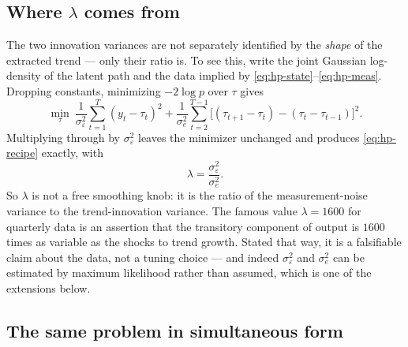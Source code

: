 \documentclass[11pt]{article}
\begin{document}
\subsection{Where \texorpdfstring{$\lambda$}{lambda} comes from}

The two innovation variances are not separately identified by the
\emph{shape} of the extracted trend --- only their ratio is.  To see
this, write the joint Gaussian log-density of the latent path and the
data implied by \eqref{eq:hp-state}--\eqref{eq:hp-meas}.  Dropping
constants, minimizing $-2\log p$ over $\tau$ gives
\begin{equation}
\min_{\tau}\ \frac{1}{\sigma_\varepsilon^2}\sum_{t=1}^{T}(y_t-\tau_t)^2
   + \frac{1}{\sigma_e^2}\sum_{t=2}^{T-1}\bigl[(\tau_{t+1}-\tau_t)-(\tau_t-\tau_{t-1})\bigr]^2.
\label{eq:hp-mle}
\end{equation}
Multiplying through by $\sigma_\varepsilon^2$ leaves the minimizer
unchanged and produces \eqref{eq:hp-recipe} exactly, with
\begin{equation}
\boxed{\ \lambda=\frac{\sigma_\varepsilon^2}{\sigma_e^2}.\ }
\label{eq:lambda}
\end{equation}
So $\lambda$ is not a free smoothing knob: it is the ratio of the
measurement-noise variance to the trend-innovation variance.  The
famous value $\lambda=1600$ for quarterly data is an assertion that the
transitory component of output is $1600$ times as variable as the
shocks to trend growth.  Stated that way, it is a falsifiable claim
about the data, not a tuning choice --- and indeed $\sigma_\varepsilon^2$
and $\sigma_e^2$ can be estimated by maximum likelihood rather than
assumed, which is one of the extensions below.

\subsection{The same problem in simultaneous form}
\end{document}
